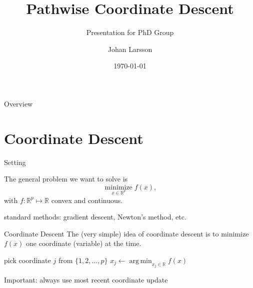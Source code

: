 \documentclass[10pt,ignorenonframetext]{beamer}
\title{Pathwise Coordinate Descent}
\subtitle{Presentation for PhD Group}
\author{Johan Larsson}
\date{\today}
\institute{Department of Statistics, Lund University}
\DeclareMathOperator*{\argmin}{arg\,min}
\begin{document}

\begin{frame}{Overview}
\tableofcontents
\end{frame}

\section{Coordinate Descent}

\begin{frame}{Setting}

The general problem we want to solve is
\[
\operatorname*{minimize}_{x \in \mathbb{R}^p} f(x),
\]
with \(f : \mathbb{R}^p \mapsto \mathbb{R}\) convex and continuous.

\begin{figure}
    \centering
\end{figure}

\alert{standard methods:} gradient descent, Newton's method, etc.

\end{frame}

\begin{frame}{Coordinate Descent}
    The (very simple) idea of coordinate descent is to minimize \(f(x)\) \alert{one coordinate (variable) at the time}.
    \begin{algorithm}[H]
        \caption{Coordinate Descent}
        \begin{algorithmic}
        \State pick coordinate \(j\) from \(\{1,2,\dots,p\}\)
        \State \(x_j \gets \argmin_{x_j \in \mathbb{R}} f(x)\)
        \EndWhile
        \end{algorithmic}
    \end{algorithm}
    
    \alert{Important:} always use most recent coordinate update
\end{frame}
\end{document}
